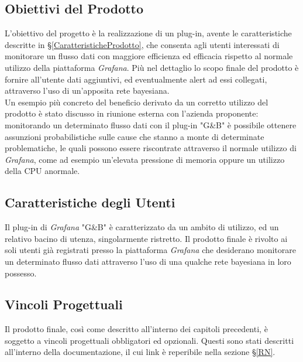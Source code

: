 \subsection{Obiettivi del Prodotto}\label{ObiettiviProdotto}
L'obiettivo del progetto è la realizzazione di un plug-in, avente le caratteristiche descritte in §\ref{CaratteristicheProdotto}, che consenta agli utenti interessati di monitorare un flusso dati con maggiore efficienza ed efficacia rispetto al normale utilizzo della piattaforma \textit{Grafana}. Più nel dettaglio lo scopo finale del prodotto è fornire all'utente dati aggiuntivi, ed eventualmente alert ad essi collegati, attraverso l'uso di un'apposita rete bayesiana.\\
Un esempio più concreto del beneficio derivato da un corretto utilizzo del prodotto è stato discusso in riunione esterna con l'azienda proponente: monitorando un determinato flusso dati con il plug-in "G\&B" è possibile ottenere assunzioni probabilistiche sulle cause che stanno a monte di determinate problematiche, le quali possono essere riscontrate attraverso il normale utilizzo di \textit{Grafana}, come ad esempio un'elevata pressione di memoria oppure un utilizzo della CPU anormale.

\subsection{Caratteristiche degli Utenti}\label{CaratteristicheUtenti}
Il plug-in di \textit{Grafana} "G\&B" è caratterizzato da un ambito di utilizzo, ed un relativo bacino di utenza, singolarmente ristretto. Il prodotto finale è rivolto ai soli utenti già registrati presso la piattaforma \textit{Grafana} che desiderano monitorare un determinato flusso dati attraverso l'uso di una qualche rete bayesiana in loro possesso.

\subsection{Vincoli Progettuali}
\label{VincoliProgettuali}

Il prodotto finale, così come descritto all'interno dei capitoli precedenti, è soggetto a vincoli progettuali obbligatori ed opzionali. Questi sono stati descritti all'interno della documentazione, il cui link è reperibile nella sezione §\ref{RN}. \\


